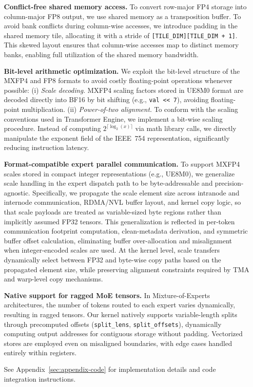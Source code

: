 \textbf{Conflict-free shared memory access.}
To convert row-major FP4 storage into column-major FP8 output, we use shared memory as a transposition buffer. To avoid bank conflicts during column-wise accesses, we introduce padding in the shared memory tile, allocating it with a stride of \texttt{[TILE\_DIM][TILE\_DIM + 1]}. This skewed layout ensures that column-wise accesses map to distinct memory banks, enabling full utilization of the shared memory bandwidth.

\textbf{Bit-level arithmetic optimization.}
We exploit the bit-level structure of the MXFP4 and FP8 formats to avoid costly floating-point operations whenever possible: (i) \emph{Scale decoding.} MXFP4 scaling factors stored in UE8M0 format are decoded directly into BF16 by bit shifting (e.g., \texttt{val \texttt{<<} 7}), avoiding floating-point multiplication. (ii) \emph{Power-of-two alignment.} To conform with the scaling conventions used in Transformer Engine, we implement a bit-wise scaling procedure. Instead of computing $2^{\lceil \log_2(x) \rceil}$ via math library calls, we directly manipulate the exponent field of the IEEE~754 representation, significantly reducing instruction latency.

\textbf{Format-compatible expert parallel communication.} 
To support MXFP4 scales stored in compact integer representations (e.g., UE8M0), we generalize scale handling in the expert dispatch path to be byte-addressable and precision-agnostic. Specifically, we propagate the scale element size across intranode and internode communication, RDMA/NVL buffer layout, and kernel copy logic, so that scale payloads are treated as variable-sized byte regions rather than implicitly assumed FP32 tensors. This generalization is reflected in per-token communication footprint computation, clean-metadata derivation, and symmetric buffer offset calculation, eliminating buffer over-allocation and misalignment when integer-encoded scales are used. At the kernel level, scale transfers dynamically select between FP32 and byte-wise copy paths based on the propagated element size, while preserving alignment constraints required by TMA and warp-level copy mechanisms.

\textbf{Native support for ragged MoE tensors.}
In Mixture-of-Experts architectures, the number of tokens routed to each expert varies dynamically, resulting in ragged tensors. Our kernel natively supports variable-length splits through precomputed offsets (\texttt{split\_lens}, \texttt{split\_offsets}), dynamically computing output addresses for contiguous storage without padding. Vectorized stores are employed even on misaligned boundaries, with edge cases handled entirely within registers.

See Appendix~\ref{sec:appendix-code} for implementation details and code integration instructions.